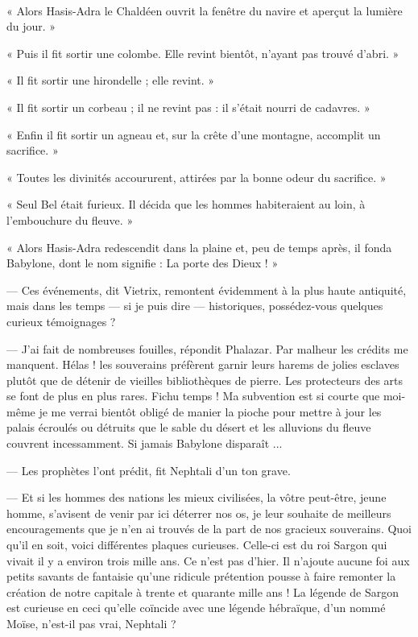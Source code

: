 \documentclass[a4paper, 11pt, oneside, polutonikogreek, french]{article}
\begin{document}
\paragraph{}
« Alors Hasis-Adra le Chaldéen ouvrit la fenêtre du navire et aperçut la lumière du jour. »

« Puis il fit sortir une colombe. Elle revint bientôt, n'ayant pas trouvé d'abri. »

« Il fit sortir une hirondelle ; elle revint. »

« Il fit sortir un corbeau ; il ne revint pas : il s'était nourri de cadavres. »

« Enfin il fit sortir un agneau et, sur la crête d'une montagne, accomplit un sacrifice. »

« Toutes les divinités accoururent, attirées par la bonne odeur du sacrifice. »

« Seul Bel était furieux. Il décida que les hommes habiteraient au loin, à l'embouchure du fleuve. »

« Alors Hasis-Adra redescendit dans la plaine et, peu de temps après, il fonda Babylone, dont le nom signifie : La porte des Dieux ! »

\bigskip
\centerline{\EightStarTaper}
\centerline{\EightStarTaper\EightStarTaper}
\bigskip

--- Ces événements, dit Vietrix, remontent évidemment à la plus haute antiquité, mais dans les temps --- si je puis dire --- historiques, possédez-vous quelques curieux témoignages ?

--- J'ai fait de nombreuses fouilles, répondit Phalazar. Par malheur les crédits me manquent. Hélas ! les souverains préfèrent garnir leurs harems de jolies esclaves plutôt que de détenir de vieilles bibliothèques de pierre. Les protecteurs des arts se font de plus en plus rares. Fichu temps ! Ma subvention est si courte que moi-même je me verrai bientôt obligé de manier la pioche pour mettre à jour les palais écroulés ou détruits que le sable du désert et les alluvions du fleuve couvrent incessamment. Si jamais Babylone disparaît ...

--- Les prophètes l'ont prédit, fit Nephtali d'un ton grave.

--- Et si les hommes des nations les mieux civilisées, la vôtre peut-être, jeune homme, s'avisent de venir par ici déterrer nos os, je leur souhaite de meilleurs encouragements que je n'en ai trouvés de la part de nos gracieux souverains. Quoi qu'il en soit, voici différentes plaques curieuses. Celle-ci est du roi Sargon qui vivait il y a environ trois mille ans. Ce n'est pas d'hier. Il n'ajoute aucune foi aux petits savants de fantaisie qu'une ridicule prétention pousse à faire remonter la création de notre capitale à trente et quarante mille ans ! La légende de Sargon est curieuse en ceci qu'elle coïncide avec une légende hébraïque, d'un nommé Moïse, n'est-il pas vrai, Nephtali ?
\end{document}
